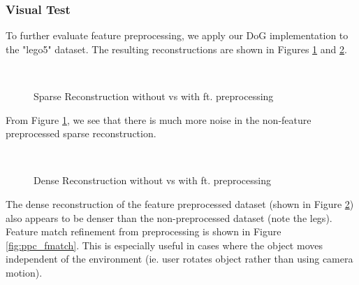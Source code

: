 \documentclass[conference,compsoc]{IEEEtran}
\begin{document}
\subsubsection{Visual Test}
To further evaluate feature preprocessing, we apply our DoG implementation to 
the "lego5" dataset. The resulting reconstructions are shown in Figures \ref{fig:ppc_sparse}
and \ref{fig:ppc_dense}. 
\begin{figure}[ht!]
    \centering
    \
    \caption{Sparse Reconstruction without vs with ft. preprocessing}
    \label{fig:ppc_sparse}
\end{figure}
From Figure \ref{fig:ppc_sparse}, we see that there is much more noise in the
non-feature preprocessed sparse reconstruction. 

\begin{figure}[ht!]
    \centering
    \
    \caption{Dense Reconstruction without vs with ft. preprocessing}
    \label{fig:ppc_dense}
\end{figure}
The dense reconstruction of the feature preprocessed dataset (shown in 
Figure \ref{fig:ppc_dense}) also appears to be denser than the non-preprocessed
dataset (note the legs). Feature match refinement from preprocessing
is shown in Figure \ref{fig:ppc_fmatch}. This is especially useful in cases where
the object moves independent of the environment (ie. user rotates object rather 
than using camera motion).
\end{document}
